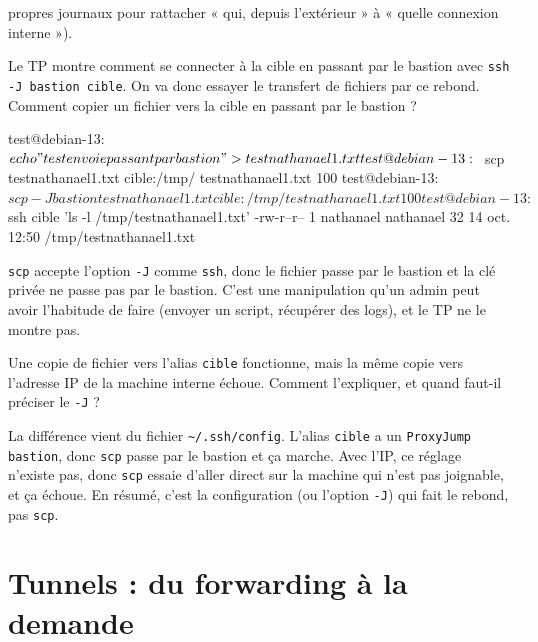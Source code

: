 \documentclass[a4paper,10pt]{exam}
\begin{document}
\begin{questions}
\begin{solution}
propres journaux pour rattacher « qui, depuis l'extérieur » à « quelle connexion interne »).
\end{solution}
\question Le TP montre comment se connecter à la cible en passant par le bastion avec
\texttt{ssh -J bastion cible}. On va donc essayer le transfert de fichiers par ce rebond.
Comment copier un fichier vers la cible en passant par le bastion ?
\begin{solution}
\begin{bashcode}
test@debian-13:~$ echo "test envoie passant par bastion" > testnathanael1.txt
test@debian-13:~$ scp testnathanael1.txt cible:/tmp/
testnathanael1.txt                      100%
test@debian-13:~$ scp -J bastion testnathanael1.txt cible:/tmp/
testnathanael1.txt                      100%
test@debian-13:~$ ssh cible 'ls -l /tmp/testnathanael1.txt'
-rw-r--r-- 1 nathanael nathanael 32 14 oct. 12:50 /tmp/testnathanael1.txt
\end{bashcode}
\texttt{scp} accepte l'option \texttt{-J} comme \texttt{ssh}, donc le fichier passe par le
bastion et la clé privée ne passe pas par le bastion. C'est une manipulation qu'un admin
peut avoir l'habitude de faire (envoyer un script, récupérer des logs), et le TP ne le
montre pas.
\end{solution}
\question Une copie de fichier vers l'alias \texttt{cible} fonctionne, mais la même copie
vers l'adresse IP de la machine interne échoue. Comment l'expliquer, et quand faut-il
préciser le \texttt{-J} ?
\begin{solution}
La différence vient du fichier \texttt{\textasciitilde/.ssh/config}. L'alias \texttt{cible}
a un \texttt{ProxyJump bastion}, donc \texttt{scp} passe par le bastion et ça marche. Avec
l'IP, ce réglage n'existe pas, donc \texttt{scp} essaie d'aller direct sur la machine qui
n'est pas joignable, et ça échoue. En résumé, c'est la configuration (ou l'option
\texttt{-J}) qui fait le rebond, pas \texttt{scp}.
\end{solution}
\end{questions}

\section{Tunnels : du forwarding à la demande}
\end{document}
